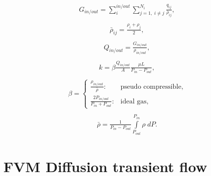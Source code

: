 \documentclass[a4paper,12pt]{extreport}
\begin{document}
    \begin{eqnarray}
        \begin{gathered}
            G_{in/out} = \sum_{i}^{in/out} \sum^{N_{i}}_{j=1, \; i\neq j} \frac{q_{ij}}{\bar{\rho}_{ij}},
        \end{gathered}
    \end{eqnarray}
    \begin{eqnarray}
        \begin{gathered}
            \bar{\rho}_{ij} = \frac{\rho_{i}+\rho_{j}}{2},
        \end{gathered}
    \end{eqnarray}
    \begin{eqnarray}
        \begin{gathered}
            Q_{in/out} = \frac{G_{in/out}}{\rho_{in/out}},
        \end{gathered}
    \end{eqnarray}
    \begin{eqnarray}
        \begin{gathered}
            k = \beta \frac{Q_{in/out}}{A} \frac{\mu L}{P_{in} - P_{out}},
        \end{gathered}
    \end{eqnarray}
    \begin{eqnarray}
        \begin{gathered}
            \beta =\begin{cases}
                       \frac{\rho_{in/out}}{\bar{\rho}}: &\text{pseudo compressible},\\
                       \frac{2P_{in/out}}{P_{in} + P_{out}}: &\text{ideal gas},
            \end{cases}
        \end{gathered}
    \end{eqnarray}
    \begin{eqnarray}
        \begin{gathered}
            \bar{\rho}=\frac{1}{P_{in}-P_{out}} \int\limits^{P_{in}}_{P_{out}}\rho \; dP.
        \end{gathered}
    \end{eqnarray}

    \section*{FVM Diffusion transient flow}
\end{document}
